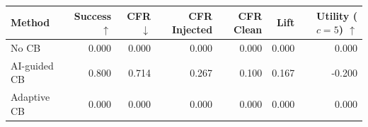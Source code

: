 \begin{tabular}{lrrrrrr}
\toprule
Method & Success $\uparrow$ & CFR $\downarrow$ & CFR Injected & CFR Clean & Lift & Utility ($c=5$) $\uparrow$ \\
\midrule
No CB & 0.000 & 0.000 & 0.000 & 0.000 & 0.000 & 0.000 \\
AI-guided CB & 0.800 & 0.714 & 0.267 & 0.100 & 0.167 & -0.200 \\
Adaptive CB & 0.000 & 0.000 & 0.000 & 0.000 & 0.000 & 0.000 \\
\bottomrule
\end{tabular}
